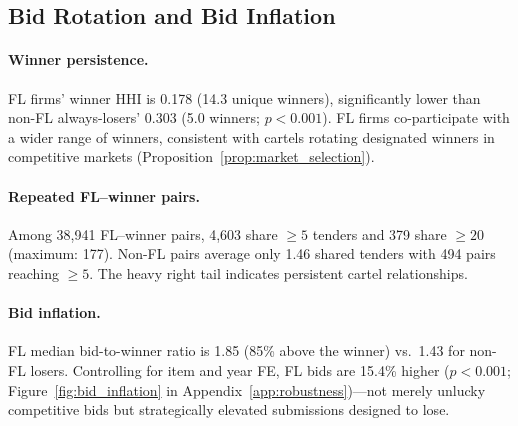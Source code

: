 
\subsection{Bid Rotation and Bid Inflation}
\label{sec:bid_rotation}

\paragraph{Winner persistence.}
FL firms' winner HHI is 0.178 (14.3 unique winners), significantly
lower than non-FL always-losers' 0.303 (5.0 winners; $p < 0.001$).
FL firms co-participate with a wider range of winners, consistent
with cartels rotating designated winners in competitive markets
(Proposition~\ref{prop:market_selection}).

\paragraph{Repeated FL--winner pairs.}
Among 38,941 FL--winner pairs, 4,603 share $\geq 5$ tenders and
379 share $\geq 20$ (maximum: 177). Non-FL pairs average only
1.46 shared tenders with 494 pairs reaching $\geq 5$. The heavy
right tail indicates persistent cartel relationships.

\paragraph{Bid inflation.}
FL median bid-to-winner ratio is 1.85 (85\% above the winner) vs.\
1.43 for non-FL losers. Controlling for item and year FE, FL bids
are 15.4\% higher ($p < 0.001$;
Figure~\ref{fig:bid_inflation} in Appendix~\ref{app:robustness})---not
merely unlucky competitive bids but strategically elevated submissions
designed to lose.
